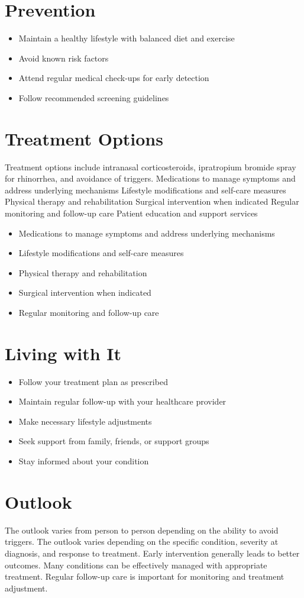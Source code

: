 \section{Prevention}
\begin{itemize}[noitemsep]
  \item Maintain a healthy lifestyle with balanced diet and exercise
  \item Avoid known risk factors
  \item Attend regular medical check-ups for early detection
  \item Follow recommended screening guidelines
\end{itemize}
\section{Treatment Options}
Treatment options include intranasal corticosteroids, ipratropium bromide spray for rhinorrhea, and avoidance of triggers. Medications to manage symptoms and address underlying mechanisms Lifestyle modifications and self-care measures Physical therapy and rehabilitation Surgical intervention when indicated Regular monitoring and follow-up care Patient education and support services

\begin{itemize}[noitemsep]
  \item Medications to manage symptoms and address underlying mechanisms
  \item Lifestyle modifications and self-care measures
  \item Physical therapy and rehabilitation
  \item Surgical intervention when indicated
  \item Regular monitoring and follow-up care
\end{itemize}
\section{Living with It}
\begin{itemize}[noitemsep]
  \item Follow your treatment plan as prescribed
  \item Maintain regular follow-up with your healthcare provider
  \item Make necessary lifestyle adjustments
  \item Seek support from family, friends, or support groups
  \item Stay informed about your condition
\end{itemize}
\section{Outlook}
The outlook varies from person to person depending on the ability to avoid triggers. The outlook varies depending on the specific condition, severity at diagnosis, and response to treatment. Early intervention generally leads to better outcomes. Many conditions can be effectively managed with appropriate treatment. Regular follow-up care is important for monitoring and treatment adjustment.
